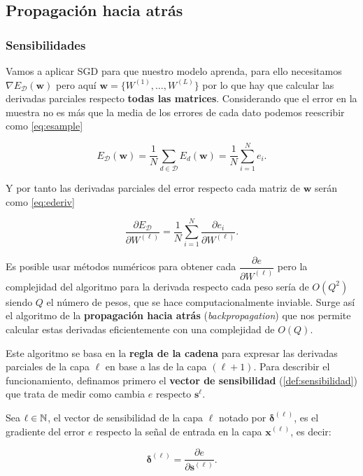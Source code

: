 \subsection{Propagación hacia atrás}

\subsubsection{Sensibilidades}

Vamos a aplicar SGD para que nuestro modelo aprenda, para ello necesitamos $\nabla E_{\mathcal{D}} (\textbf{w})$ pero aquí $\textbf{w} = \{W^{(1)}, \ldots, W^{(L)}\}$ por lo que hay que calcular las derivadas parciales respecto \textbf{todas las matrices}. Considerando que el error en la muestra no es más que la media de los errores de cada dato podemos reescribir como \eqref{eq:esample}

\begin{equation}
  E_{\mathcal{D}}(\textbf{w}) = \dfrac{1}{N} \sum \limits_{d \in \mathcal{D}} E_d(\textbf{w}) = \dfrac{1}{N} \sum \limits^N_{i = 1} e_i.
  \label{eq:esample}
\end{equation}

Y por tanto las derivadas parciales del error respecto cada matriz de $\textbf{w}$ serán como \eqref{eq:ederiv}

\begin{equation}
  \dfrac{\partial E_{\mathcal{D}}}{\partial W^{(\ell)}} = \dfrac{1}{N} \sum \limits^N_{i = 1} \dfrac{\partial e_i}{\partial W^{(\ell)}}.
  \label{eq:ederiv}
\end{equation}

Es posible usar métodos numéricos para obtener cada $\dfrac{\partial e}{\partial W^{(\ell)}}$ pero la complejidad del algoritmo para la derivada respecto cada peso sería de $O(Q^2)$ siendo $Q$ el número de pesos, que se hace computacionalmente inviable. Surge así el algoritmo de la \textbf{propagación hacia atrás} (\emph{backpropagation}) que nos permite calcular estas derivadas eficientemente con una complejidad de $O(Q)$.

Este algoritmo se basa en la \textbf{regla de la cadena} para expresar las derivadas parciales de la capa $\ell$ en base a las de la capa $(\ell + 1)$. Para describir el funcionamiento, definamos primero el \textbf{vector de sensibilidad} (\autoref{def:sensibilidad}) que trata de medir como cambia $e$ respecto $\textbf{s}^{\ell}$.

\begin{definicion}
  Sea $\ell \in \mathbb{N}$, el vector de sensibilidad de la capa $\ell$ notado por $\pmb{\delta}^{(\ell)}$, es el gradiente del error $e$ respecto la señal de entrada en la capa $\textbf{x}^{(\ell)}$, es decir:

  $$\pmb{\delta}^{(\ell)} = \dfrac{\partial e}{\partial \textbf{s}^{(\ell)}}.$$
  \label{def:sensibilidad}
\end{definicion}

